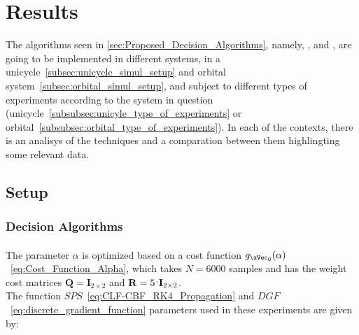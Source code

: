 
%


\chapter{Results}
\label{cha:results}

The algorithms seen in \ref{sec:Proposed_Decision_Algorithms}, namely, \label{subsec:decision_algorithms} ,  and ,  are going to be implemented in different systems, in a unicycle~\ref{subsec:unicycle_simul_setup} and orbital system~\ref{subsec:orbital_simul_setup}, and subject to different types of experiments according to the system in question (unicycle~\ref{subsubsec:unicyle_type_of_experiments} or orbital~\ref{subsubsec:orbital_type_of_experiments}). In each of the contexts, there is an analisys of the techniques and a comparation between them highlingting some relevant data.

\section{Setup}
\label{sec:setup}

\subsection{Decision Algorithms}
\label{subsec:decision_algorithms}

\subsubsection{}
\label{subsubsec:A-JO_parameters}

The parameter \(\alpha\) is optimized based on a cost function \(g_{\xVec_0}(\alpha)\)~\ref{eq:Cost_Function_Alpha}, which takes \(N=6000\) samples and has the weight cost matrices \(\mathbf{Q} = \mathbf{I}_{2\times 2} \) and \(\mathbf{R} = 5 \hspace{0.1em}^.\mathbf{I}_{2\times 2} \).\\

The function \(SPS\)~\ref{eq:CLF-CBF_RK4_Propagation} and \(DGF\)~\ref{eq:discrete_gradient_function} parameters used in these experiments are given by:


